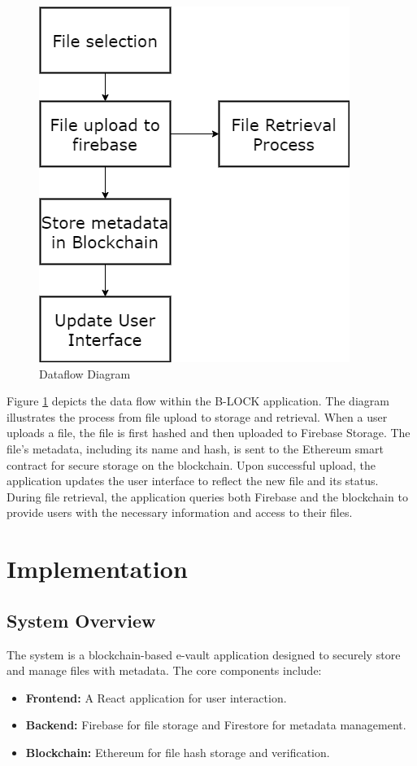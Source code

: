\documentclass[12pt,a4paper]{report}
\begin{document}
\begin{figure}[hbtp]
\centering
\includegraphics[scale=0.5]{./pic/dataflow.png}
\caption{Dataflow Diagram}
\label{fig:dataflow}
\end{figure}
Figure \ref{fig:dataflow} depicts the data flow within the B-LOCK application. The diagram illustrates the process from file upload to storage and retrieval. When a user uploads a file, the file is first hashed and then uploaded to Firebase Storage. The file's metadata, including its name and hash, is sent to the Ethereum smart contract for secure storage on the blockchain. Upon successful upload, the application updates the user interface to reflect the new file and its status. During file retrieval, the application queries both Firebase and the blockchain to provide users with the necessary information and access to their files.



\chapter{Implementation}
\section{System Overview}
\par
The system is a blockchain-based e-vault application designed to securely store and manage files with metadata. The core components include:
\begin{itemize}
   \item \textbf{Frontend:} A React application for user interaction.
   \item \textbf{Backend:} Firebase for file storage and Firestore for metadata management.
   \item \textbf{Blockchain:} Ethereum for file hash storage and verification.
\end{itemize}
\end{document}

